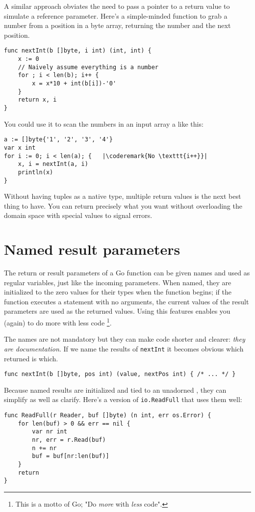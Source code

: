A similar approach obviates the need to pass a pointer to a return value to
simulate a reference parameter. Here's a simple-minded function to grab a
number from a position in a byte array, returning the number and the next
position.
\begin{lstlisting}
func nextInt(b []byte, i int) (int, int) {
    x := 0
    // Naively assume everything is a number
    for ; i < len(b); i++ {
        x = x*10 + int(b[i])-'0'
    }
    return x, i
}
\end{lstlisting}
You could use it to scan the numbers in an input array a like this:
\begin{lstlisting}
a := []byte{'1', '2', '3', '4'}
var x int
for i := 0; i < len(a); {	|\coderemark{No \texttt{i++}}|
    x, i = nextInt(a, i)
    println(x)
}
\end{lstlisting}
Without having tuples as a native type, multiple return values is the next
best thing to have. You can return precisely what you want without
overloading the domain space with special values to signal errors.

\section{Named result parameters}
\label{sec:named result parameters}
The return or result parameters of a Go function can be given names and used
as regular variables, just like the incoming parameters. When named, they are
initialized to the zero values for their types when the function begins; if the
function executes a  statement with no arguments, the current values of
the result parameters are used as the returned values. Using this
features enables you (again) to do more with less code \footnote{This is
a motto of Go; "Do \emph{more} with \emph{less} code".}.

The names are not mandatory but they can make code shorter and clearer:
\emph{they are documentation}. 
If we name the results of \lstinline{nextInt} it becomes obvious which
returned  is which.

\begin{lstlisting}
func nextInt(b []byte, pos int) (value, nextPos int) { /* ... */ }
\end{lstlisting}
Because named results are initialized and tied to an unadorned
,
they can simplify as well as clarify. Here's a version of
\lstinline{io.ReadFull} that uses them well:

\begin{lstlisting}
func ReadFull(r Reader, buf []byte) (n int, err os.Error) {
    for len(buf) > 0 && err == nil {
        var nr int
        nr, err = r.Read(buf)
        n += nr
        buf = buf[nr:len(buf)]
    }
    return
}
\end{lstlisting}

